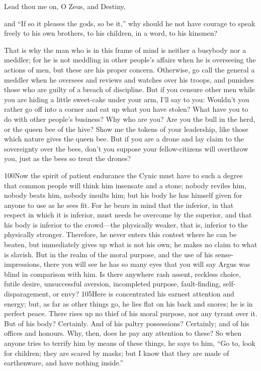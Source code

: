 Lead thou me on, O Zeus, and Destiny,

and ``If so it pleases the gods, so be it,'' why should he not have courage to speak freely to his own brothers, to his children, in a word, to his kinsmen?

That is why the man who is in this frame of mind is neither a busybody nor a meddler; for he is not meddling in other people's affairs when he is overseeing the actions of men, but these are his proper concern. Otherwise, go call the general a meddler when he oversees and reviews and watches over his troops, and punishes those who are guilty of a breach of discipline. But if you censure other men while you are hiding a little sweet-cake under your arm, I'll say to you: Wouldn't you rather go off into a corner and eat up what you have stolen? What have you to do with other people's business? Why who are you? Are you the bull in the herd, or the queen bee of the hive? Show me the tokens of your leadership, like those which nature gives the queen bee. But if you are a drone and lay claim to the sovereignty over the bees, don't you suppose your fellow-citizens will overthrow you, just as the bees so treat the drones?

100Now the spirit of patient endurance the Cynic must have to such a degree that common people will think him insensate and a stone; nobody reviles him, nobody beats him, nobody insults him; but his body he has himself given for anyone to use as he sees fit. For he bears in mind that the inferior, in that respect in which it is inferior, must needs be overcome by the superior, and that his body is inferior to the crowd—the physically weaker, that is, inferior to the physically stronger. Therefore, he never enters this contest where he can be beaten, but immediately gives up what is not his own; he makes no claim to what is slavish. But in the realm of the moral purpose, and the use of his sense-impressions, there you will see he has so many eyes that you will say Argus was blind in comparison with him. Is there anywhere rash assent, reckless choice, futile desire, unsuccessful aversion, incompleted purpose, fault-finding, self-disparagement, or envy? 105Here is concentrated his earnest attention and energy; but, as far as other things go, he lies flat on his back and snores; he is in perfect peace. There rises up no thief of his moral purpose, nor any tyrant over it. But of his body? Certainly. And of his paltry possessions? Certainly; and of his offices and honours. Why, then, does he pay any attention to these? So when anyone tries to terrify him by means of these things, he says to him, ``Go to, look for children; they are scared by masks; but I know that they are made of earthenware, and have nothing inside.''

